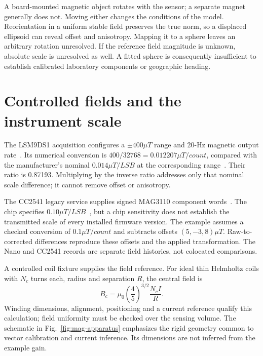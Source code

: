 A board-mounted magnetic object rotates with the sensor; a separate magnet generally does not. Moving either changes the conditions of the model. Reorientation in a uniform stable field preserves the true norm, so a displaced ellipsoid can reveal offset and anisotropy. Mapping it to a sphere leaves an arbitrary rotation unresolved. If the reference field magnitude is unknown, absolute scale is unresolved as well. A fitted sphere is consequently insufficient to establish calibrated laboratory components or geographic heading.

\section{Controlled fields and the instrument scale}
The LSM9DS1 acquisition configures a $\pm400\unit{\mu T}$ range and 20-Hz magnetic output rate~\cite{arduinoimu}. Its numerical conversion is $400/32768=0.012207\unit{\mu T/count}$, compared with the manufacturer's nominal $0.014\unit{\mu T/LSB}$ at the corresponding range~\cite{lsm9ds1}. Their ratio is 0.87193. Multiplying by the inverse ratio addresses only that nominal scale difference; it cannot remove offset or anisotropy.

The CC2541 legacy service supplies signed MAG3110 component words~\cite{cc2541protocol}. The chip specifies $0.10\unit{\mu T/LSB}$~\cite{mag3110}, but a chip sensitivity does not establish the transmitted scale of every installed firmware version. The example assumes a checked conversion of $0.1\unit{\mu T/count}$ and subtracts offsets $(5,-3,8)\unit{\mu T}$. Raw-to-corrected differences reproduce these offsets and the applied transformation. The Nano and CC2541 records are separate field histories, not colocated comparisons.

A controlled coil fixture supplies the field reference. For ideal thin Helmholtz coils with $N_c$ turns each, radius and separation $R$, the central field is
\begin{equation}
 B_c=\mu_0\left(\frac45\right)^{3/2}\frac{N_cI}{R}.
 \label{eq:mag-coil}
\end{equation}
Winding dimensions, alignment, positioning and a current reference qualify this calculation; field uniformity must be checked over the sensing volume. The schematic in Fig.~\ref{fig:mag-apparatus} emphasizes the rigid geometry common to vector calibration and current inference. Its dimensions are not inferred from the example gain.

